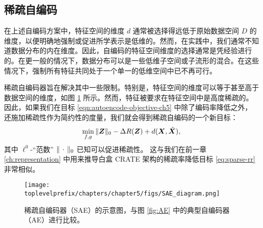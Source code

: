 \documentclass[../../book-main.tex]{subfiles}
\begin{document}
\subsection{稀疏自编码}
在上述自编码方案中，特征空间的维度 $d$ 通常被选择得远低于原始数据空间 $D$ 的维度，以便明确地强制或促进所学表示是低维的。然而，在实践中，我们通常不知道数据分布的内在维度。因此，自编码的特征空间维度的选择通常是凭经验进行的。在更一般的情况下，数据分布可以是一些低维子空间或子流形的混合。在这些情况下，强制所有特征共同处于一个单一的低维空间中已不再可行。

稀疏自编码器旨在解决其中一些限制。特别是，特征空间的维度可以等于甚至高于数据空间的维度，如图 \ref{fig:SAE} 所示。然而，特征被要求在特征空间中是高度稀疏的。因此，如果我们在目标 \eqref{eqn:autoencode-objective-ch5} 中除了编码率降低之外，还施加稀疏性作为简约性的度量，我们就会得到稀疏自编码的一个新目标：
\begin{equation}
  \min_{f, g}
  \|\bm{Z}\|_0 - \Delta R(\bm{Z}) + d(\bm{X}, \hat {\bm{X}}),
  \label{eqn:autoencode-sparse}
\end{equation}
其中 $\ell^0$-“范数” $\|\,\cdot\,\|_0$ 已知可以促进稀疏性。
这与我们在前一章 \ref{ch:representation} 中用来推导白盒 CRATE 架构的稀疏率降低目标 \eqref{eq:sparse-rr} 非常相似。

\begin{figure}
  \centering
  \texttt{[image: \\toplevelprefix/chapters/chapter5/figs/SAE\_diagram.png]}
  \caption{稀疏自编码器（SAE）的示意图，与图 \ref{fig:AE} 中的典型自编码器（AE）进行比较。}
  \label{fig:SAE}
\end{figure}

\end{document}
